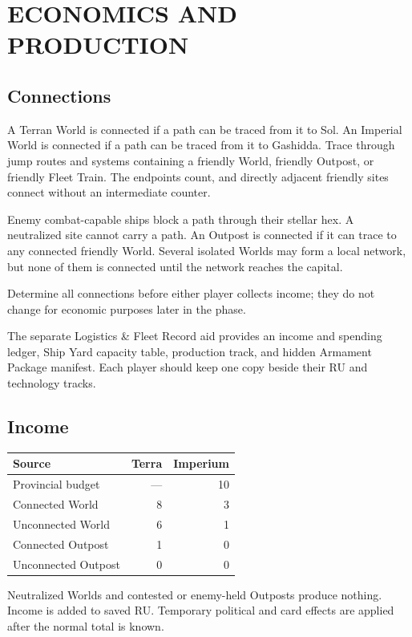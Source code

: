 \section{ECONOMICS AND PRODUCTION}

\subsection{Connections}

A Terran World is connected if a path can be traced from it to Sol. An Imperial
World is connected if a path can be traced from it to Gashidda. Trace through
jump routes and systems containing a friendly World, friendly Outpost, or
friendly Fleet Train. The endpoints count, and directly adjacent friendly
sites connect without an intermediate counter.

Enemy combat-capable ships block a path through their stellar hex. A
neutralized site cannot carry a path. An Outpost is connected if it can trace
to any connected friendly World. Several isolated Worlds may form a local
network, but none of them is connected until the network reaches the capital.

Determine all connections before either player collects income; they do not
change for economic purposes later in the phase.

The separate Logistics \& Fleet Record aid provides an income and spending
ledger, Ship Yard capacity table, production track, and hidden Armament Package
manifest. Each player should keep one copy beside their RU and technology
tracks.

\subsection{Income}

\begin{tabularx}{\columnwidth}{@{}Xrr@{}}
\toprule
Source & Terra & Imperium \\
\midrule
Provincial budget & --- & 10 \\
Connected World & 8 & 3 \\
Unconnected World & 6 & 1 \\
Connected Outpost & 1 & 0 \\
Unconnected Outpost & 0 & 0 \\
\bottomrule
\end{tabularx}

Neutralized Worlds and contested or enemy-held Outposts produce nothing.
Income is added to saved RU. Temporary political and card effects are applied
after the normal total is known.

